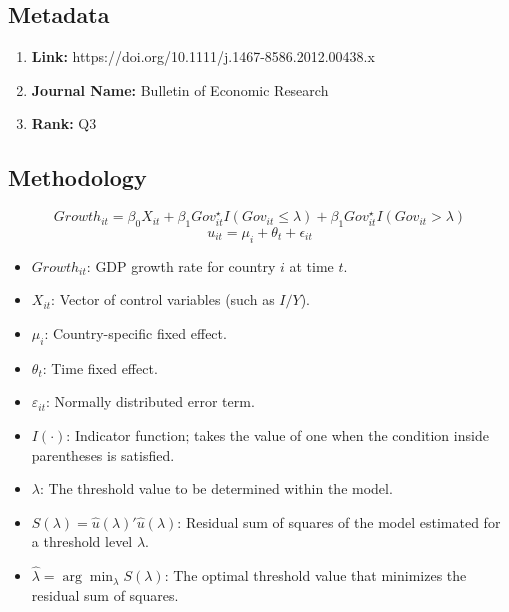 \documentclass[10pt, oneside]{article}
\begin{document}
\subsection{Metadata}
\begin{enumerate}
	\item \textbf{Link:} https://doi.org/10.1111/j.1467-8586.2012.00438.x
	\item \textbf{Journal Name:} Bulletin of Economic Research
	\item \textbf{Rank:} Q3
\end{enumerate}

\subsection{Methodology}
$$
	Growth_{it} = \beta_0 X_{it} + \beta_1 Gov_{it}^\star I (Gov_{it}\le \lambda) + \beta_1 Gov_{it}^\star I (Gov_{it} > \lambda)
$$
$$
	u_{it} = \mu_i + \theta_t + \epsilon_{it}
$$
\begin{itemize}
	\item $Growth_{it}$: GDP growth rate for country $i$ at time $t$.
	\item $X_{it}$: Vector of control variables (such as $I/Y$).
	\item $\mu_i$: Country-specific fixed effect.
	\item $\theta_t$: Time fixed effect.
	\item $\varepsilon_{it}$: Normally distributed error term.
	\item $I(\cdot)$: Indicator function; takes the value of one when the condition inside parentheses is satisfied.
	\item $\lambda$: The threshold value to be determined within the model.
	\item $S(\lambda) = \hat{u}(\lambda)' \hat{u}(\lambda)$: Residual sum of squares of the model estimated for a threshold level $\lambda$.
	\item $\hat{\lambda} = \arg \min_{\lambda} S(\lambda)$: The optimal threshold value that minimizes the residual sum of squares.
\end{itemize}
\end{document}
